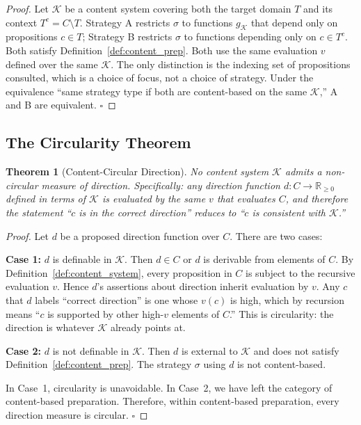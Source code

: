 \documentclass[11pt,twocolumn,a4paper]{article}
\newtheorem{theorem}{Theorem}[section]
\begin{document}
\begin{proof}
Let $\mathcal{K}$ be a content system covering both the target domain $T$ and its context $T^c = C \setminus T$. Strategy A restricts $\sigma$ to functions $g_\mathcal{K}$ that depend only on propositions $c \in T$; Strategy B restricts $\sigma$ to functions depending only on $c \in T^c$. Both satisfy Definition~\ref{def:content_prep}. Both use the same evaluation $v$ defined over the same $\mathcal{K}$. The only distinction is the indexing set of propositions consulted, which is a choice of focus, not a choice of strategy. Under the equivalence ``same strategy type if both are content-based on the same $\mathcal{K}$,'' A and B are equivalent. $\square$
\end{proof}

\subsection{The Circularity Theorem}

\begin{theorem}[Content-Circular Direction]
\label{thm:circularity}
No content system $\mathcal{K}$ admits a non-circular measure of direction. Specifically: any direction function $d: C \to \mathbb{R}_{\geq 0}$ defined in terms of $\mathcal{K}$ is evaluated by the same $v$ that evaluates $C$, and therefore the statement ``$c$ is in the correct direction'' reduces to ``$c$ is consistent with $\mathcal{K}$.''
\end{theorem}

\begin{proof}
Let $d$ be a proposed direction function over $C$. There are two cases:

\textbf{Case 1:} $d$ is definable in $\mathcal{K}$. Then $d \in C$ or $d$ is derivable from elements of $C$. By Definition~\ref{def:content_system}, every proposition in $C$ is subject to the recursive evaluation $v$. Hence $d$'s assertions about direction inherit evaluation by $v$. Any $c$ that $d$ labels ``correct direction'' is one whose $v(c)$ is high, which by recursion means ``$c$ is supported by other high-$v$ elements of $C$.'' This is circularity: the direction is whatever $\mathcal{K}$ already points at.

\textbf{Case 2:} $d$ is not definable in $\mathcal{K}$. Then $d$ is external to $\mathcal{K}$ and does not satisfy Definition~\ref{def:content_prep}. The strategy $\sigma$ using $d$ is not content-based.

In Case~1, circularity is unavoidable. In Case~2, we have left the category of content-based preparation. Therefore, within content-based preparation, every direction measure is circular. $\square$
\end{proof}
\end{document}

